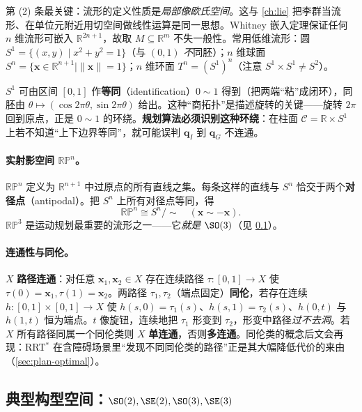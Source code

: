 \noindent 第 (2) 条最关键：流形的定义性质是\emph{局部像欧氏空间}。这与 \cref{ch:lie} 把李群当流形、在单位元附近用切空间做线性运算是同一思想。Whitney 嵌入定理保证任何 $n$ 维流形可嵌入 $\mathbb{R}^{2n+1}$，故取 $M\subseteq\mathbb{R}^m$ 不失一般性。常用低维流形：圆 $S^1=\{(x,y)\mid x^2+y^2=1\}$（与 $(0,1)$ \emph{不}同胚）；$n$ 维球面 $S^n=\{\mathbf{x}\in\mathbb{R}^{n+1}\mid\|\mathbf{x}\|=1\}$；$n$ 维环面 $T^n=(S^1)^n$（注意 $S^1\times S^1\ne S^2$）。

\begin{insight}
$S^1$ 可由区间 $[0,1]$ 作\textbf{等同}（identification）$0\sim1$ 得到（把两端“粘”成闭环），同胚由 $\theta\mapsto(\cos2\pi\theta,\sin2\pi\theta)$ 给出。这种“商拓扑”是描述旋转的关键——旋转 $2\pi$ 回到原点，正是 $0\sim1$ 的环绕。\textbf{规划算法必须识别这种环绕}：在柱面 $\mathcal{C}=\mathbb{R}\times S^1$ 上若不知道“上下边界等同”，就可能误判 $\mathbf{q}_I$ 到 $\mathbf{q}_G$ 不连通。
\end{insight}

\paragraph{实射影空间 $\mathbb{RP}^n$。}
$\mathbb{RP}^n$ 定义为 $\mathbb{R}^{n+1}$ 中过原点的所有直线之集。每条这样的直线与 $S^n$ 恰交于两个\textbf{对径点}（antipodal）。把 $S^n$ 上所有对径点等同，得
\begin{equation}
  \mathbb{RP}^n\cong S^n/\!\sim\quad(\mathbf{x}\sim-\mathbf{x}).
  \label{eq:plan-rpn}
\end{equation}
$\mathbb{RP}^3$ 是运动规划最重要的流形之一——它\emph{就是} $\SO(3)$（见 \cref{sec:plan-so3}）。

\paragraph{连通性与同伦。}
$X$ \textbf{路径连通}：对任意 $\mathbf{x}_1,\mathbf{x}_2\in X$ 存在连续路径 $\tau:[0,1]\to X$ 使 $\tau(0)=\mathbf{x}_1,\tau(1)=\mathbf{x}_2$。两路径 $\tau_1,\tau_2$（端点固定）\textbf{同伦}，若存在连续 $h:[0,1]\times[0,1]\to X$ 使 $h(s,0)=\tau_1(s)$、$h(s,1)=\tau_2(s)$、$h(0,t)$ 与 $h(1,t)$ 恒为端点。$t$ 像旋钮，连续地把 $\tau_1$ 形变到 $\tau_2$，形变中路径\emph{过不去洞}。若 $X$ 所有路径同属一个同伦类则 $X$ \textbf{单连通}，否则\textbf{多连通}。同伦类的概念后文会再现：RRT$^*$ 在含障碍场景里“发现不同同伦类的路径”正是其大幅降低代价的来由（\cref{sec:plan-optimal}）。

\subsection{典型构型空间：\texorpdfstring{$\SO(2),\SE(2),\SO(3),\SE(3)$}{(2), (2), (3), (3)}}
\label{sec:plan-so3}

